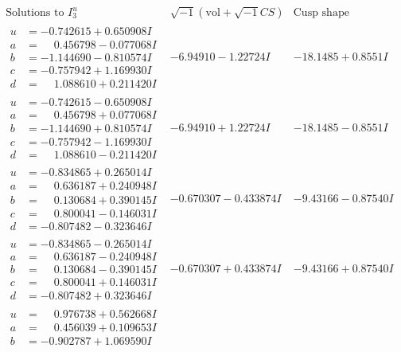 \documentclass[1p]{elsarticle_modified}
\theoremstyle{definition}
\newcommand{\I}{\sqrt{-1}}
\begin{document}
$$\begin{array}{c|c|c}  
\text{Solutions to }I^u_{3}& \I (\text{vol} + \sqrt{-1}CS) & \text{Cusp shape}\\
 \hline 
\begin{aligned}
u &= -0.742615 + 0.650908 I \\
a &= \phantom{-}0.456798 - 0.077068 I \\
b &= -1.144690 - 0.810574 I \\
c &= -0.757942 + 1.169930 I \\
d &= \phantom{-}1.088610 + 0.211420 I\end{aligned}
 & -6.94910 - 1.22724 I & -18.1485 + 0.8551 I \\ \hline\begin{aligned}
u &= -0.742615 - 0.650908 I \\
a &= \phantom{-}0.456798 + 0.077068 I \\
b &= -1.144690 + 0.810574 I \\
c &= -0.757942 - 1.169930 I \\
d &= \phantom{-}1.088610 - 0.211420 I\end{aligned}
 & -6.94910 + 1.22724 I & -18.1485 - 0.8551 I \\ \hline\begin{aligned}
u &= -0.834865 + 0.265014 I \\
a &= \phantom{-}0.636187 + 0.240948 I \\
b &= \phantom{-}0.130684 + 0.390145 I \\
c &= \phantom{-}0.800041 - 0.146031 I \\
d &= -0.807482 - 0.323646 I\end{aligned}
 & -0.670307 - 0.433874 I & -9.43166 - 0.87540 I \\ \hline\begin{aligned}
u &= -0.834865 - 0.265014 I \\
a &= \phantom{-}0.636187 - 0.240948 I \\
b &= \phantom{-}0.130684 - 0.390145 I \\
c &= \phantom{-}0.800041 + 0.146031 I \\
d &= -0.807482 + 0.323646 I\end{aligned}
 & -0.670307 + 0.433874 I & -9.43166 + 0.87540 I \\ \hline\begin{aligned}
u &= \phantom{-}0.976738 + 0.562668 I \\
a &= \phantom{-}0.456039 + 0.109653 I \\
b &= -0.902787 + 1.069590 I \\

\end{aligned}
\end{array}$$
\end{document}
